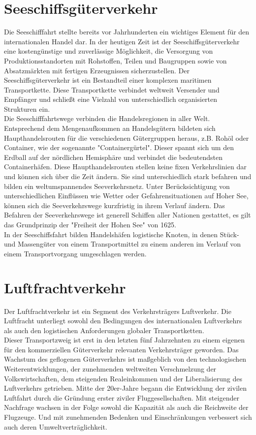 \documentclass[a4paper,12pt]{scrreprt}
\begin{document}
	
	\section{Seeschiffsgüterverkehr}
	Die Seeschifffahrt stellte bereits vor Jahrhunderten ein wichtiges Element für den internationalen Handel dar. In der heutigen Zeit ist der Seeschiffsgüterverkehr eine kostengünstige und zuverlässige Möglichkeit, die Versorgung von Produktionsstandorten mit Rohstoffen, Teilen und Baugruppen sowie von Absatzmärkten mit fertigen Erzeugnissen sicherzustellen. Der Seeschiffsgüterverkehr ist ein Bestandteil einer komplexen maritimen Transportkette. Diese Transportkette verbindet weltweit Versender und Empfänger und schließt eine Vielzahl von unterschiedlich organisierten Strukturen ein. \\
	
	Die Seeschifffahrtswege verbinden die Handelsregionen in aller Welt. Entsprechend dem Mengenaufkommen an Handelsgütern bildeten sich Haupthandelsrouten für die verschiedenen Gütergruppen heraus, z.B. Rohöl oder Container, wie der sogenannte "Containergürtel". Dieser spannt sich um den Erdball auf der nördlichen Hemisphäre und verbindet die bedeutendsten Containerhäfen. Diese Haupthandelsrouten stellen keine fixen Verkehrslinien dar und können sich über die Zeit ändern. Sie sind unterschiedlich stark befahren und bilden ein weltumspannendes Seeverkehrsnetz. Unter Berücksichtigung von unterschiedlichen Einflüssen wie Wetter oder Gefahrensituationen auf Hoher See, können sich die Seeverkehrswege kurzfristig in ihrem Verlauf ändern. Das Befahren der Seeverkehrswege ist generell Schiffen aller Nationen gestattet, es gilt das Grundprinzip der "Freiheit der Hohen See" von 1625.\\
	
	In der Seeschiffsfahrt bilden Handelshäfen logistische Knoten, in denen Stück- und Massengüter von einem Transportmittel zu einem anderen im Verlauf von einem Transportvorgang umgeschlagen werden.
	\section{Luftfrachtverkehr}
	Der Luftfrachtverkehr ist ein Segment des Verkehrsträgers Luftverkehr. Die Luftfracht unterliegt sowohl den Bedingungen des internationalen Luftverkehrs als auch den logistischen Anforderungen globaler Transportketten. \\
	
	Dieser Transportzweig ist erst in den letzten fünf Jahrzehnten zu einem eigenen für den kommerziellen Güterverkehr relevanten Verkehrsträger geworden. Das Wachstum des geflogenen Güterverkehrs ist maßgeblich von den technologischen Weiterentwicklungen, der zunehmenden weltweiten Verschmelzung der Volkswirtschaften, dem steigenden Realeinkommen und der Liberalisierung des Luftverkehrs getrieben. Mitte der 20er-Jahre begann die Entwicklung der zivilen Luftfahrt durch die Gründung erster ziviler Fluggesellschaften. Mit steigender Nachfrage wachsen in der Folge sowohl die Kapazität als auch die Reichweite der Flugzeuge. Und mit zunehmenden Bedenken und Einschränkungen verbessert sich auch deren Umweltverträglichkeit. 
\end{document}
